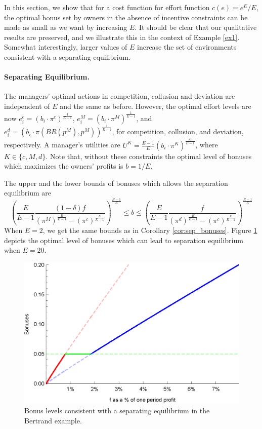 \documentclass[]{article}
\begin{document}
In this section, we show that for a cost function for effort function $c(e)=e^{E}/E$, the optimal bonus set by owners in the absence of incentive constraints can be made as small as we want by increasing $E$. It should be clear that our qualitative results are preserved, and we illustrate this in the context of Example \ref{ex1}. Somewhat interestingly, larger values of $E$ increase the set of environments consistent with a separating equilibrium.

\paragraph{Separating Equilibrium.} The managers' optimal actions in competition, collusion and deviation are independent of $E$ and the same as before. However, the optimal effort levels are now $e_i^{c}=(b_i \cdot \pi^{c})^\frac{1}{E-1}$, $e_i^{M}=(b_i \cdot \pi^{M})^\frac{1}{E-1}$, and $e_i^{d}=(b_i \cdot \pi(BR(p^M),p^M))^\frac{1}{E-1}$, for competition, collusion, and deviation, respectively. A manager's utilities are $U^{K}=\frac{E-1}{E}(b_i \cdot \pi^{K})^\frac{E}{E-1}$, where $K\in\{c,M,d\}$. Note that, without these constraints the optimal level of bonuses which maximizes the owners' profits is $b=1/E$.

The upper and the lower bounds of bonuses which allows the separation equilibrium are 
\begin{equation*}
   \left(\frac{E}{E-1}\frac{(1-\delta)f}{(\pi^M)^\frac{E}{E-1}-(\pi^c)^\frac{E}{E-1}}\right)^{\frac{E-1}{E}} \leq  b \leq  \left(\frac{E}{E-1} \frac{f}{(\pi^d)^\frac{E}{E-1}-(\pi^c)^\frac{E}{E-1}}\right)^{\frac{E-1}{E}}
\end{equation*}
When $E=2$, we get the same bounds as in Corollary \ref{cor:sep_bonuses}. Figure \ref{fig:Nbonuses} depicts the optimal level of bonuses which can lead to separation equilibrium when $E=20$.

\begin{figure}[ht]
\centering
\includegraphics[scale=0.8]{Plots/Bertrand_N_bonuses_diff.eps}
\caption{Bonus levels consistent with a separating equilibrium in the Bertrand example.}\label{fig:Nbonuses}
\end{figure}
\end{document}
